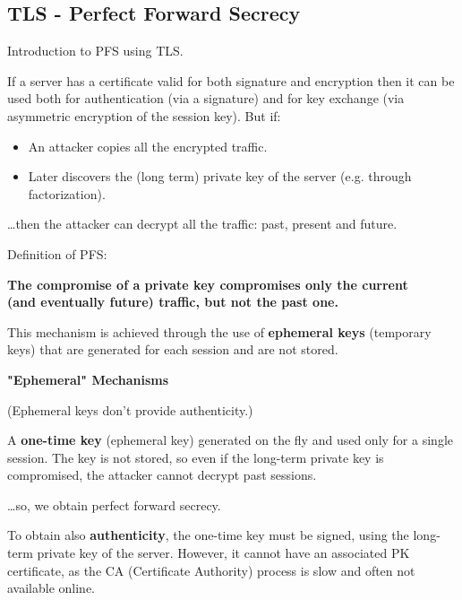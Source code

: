 \subsection{TLS - Perfect Forward Secrecy}
\begin{center}
    Introduction to PFS using TLS.
\end{center}
If a server has a certificate valid for both signature and encryption then it can be used both for authentication (via a signature) and for key exchange (via asymmetric encryption of the session key). But if:
\begin{itemize}
    \item An attacker copies all the encrypted traffic.
    \item Later discovers the (long term) private key of the server (e.g. through factorization).
\end{itemize}
\dots then the attacker can decrypt all the traffic: past, present and future.
\begin{center}
    Definition of PFS:

    \vspace{0.2cm}

    \textbf{The compromise of a private key compromises only the current \\ (and eventually future) traffic, but not the past one.}
\end{center}

\vspace{0.3cm}

This mechanism is achieved through the use of \textbf{ephemeral keys} (temporary keys) that are generated for each session and are not stored.

\begin{center}
    {\large{\textbf{"Ephemeral" Mechanisms}}}
   
    (Ephemeral keys don't provide authenticity.)
\end{center}

\noindent A \textbf{one-time key} (ephemeral key) generated on the fly and used only for a single session. The key is not stored, so even if the long-term private key is compromised, the attacker cannot decrypt past sessions.

\dots so, we obtain perfect forward secrecy.

\vspace{0.2cm}

To obtain also \textbf{authenticity}, the one-time key must be signed, using the long-term private key of the server. However, it cannot have an associated PK certificate, as the CA (Certificate Authority) process is slow and often not available online.

